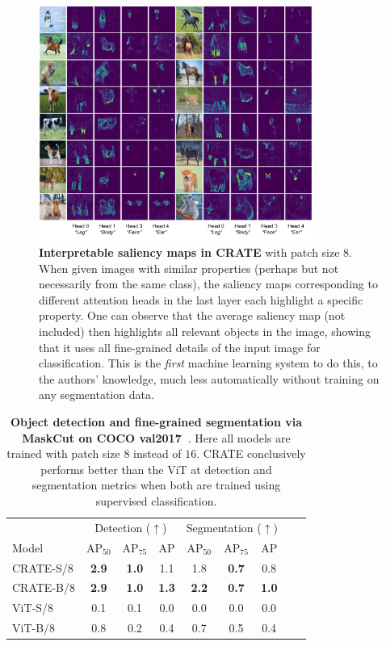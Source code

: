 \documentclass[../../book-main.tex]{subfiles}
\begin{document}
\begin{figure}
    \centering
    \includegraphics[width=0.8\textwidth]{chapters/chapter7/figs/crate_semantic_heads.pdf}
    \caption{\small\textbf{Interpretable saliency maps in CRATE} with patch size \(8\). When given images with similar properties (perhaps but not necessarily from the same class), the saliency maps corresponding to different attention heads in the last layer each highlight a specific property. One can observe that the average saliency map (not included) then highlights all relevant objects in the image, showing that it uses all fine-grained details of the input image for classification. This is the \textit{first} machine learning system to do this, to the authors' knowledge, much less automatically without training on any segmentation data.}
    \label{fig:crate_semantic_heads}
\end{figure}

\begin{table}
    \centering
    \begin{tabular}{@{}lcccccccc@{}}
    \toprule
     &  \multicolumn{3}{c}{Detection (\(\uparrow\))} &  \multicolumn{3}{c}{Segmentation (\(\uparrow\))} \\ 
    Model & AP$_{50}$ & AP$_{75}$ & AP & AP$_{50}$ & AP$_{75}$ & AP  \\ 
    \midrule
    CRATE-S/8 & \textbf{2.9} & \textbf{1.0} & 1.1 & 1.8 & \textbf{0.7} & 0.8 \\
    CRATE-B/8 & \textbf{2.9} & \textbf{1.0} & \textbf{1.3} & \textbf{2.2} & \textbf{0.7} & \textbf{1.0} \\
    ViT-S/8 & 0.1& 0.1 & 0.0 & 0.0 & 0.0 & 0.0 \\
    ViT-B/8 & 0.8 & 0.2 & 0.4 & 0.7 & 0.5 & 0.4 \\
    \bottomrule
    \end{tabular}
    \caption{\small \textbf{Object detection and fine-grained segmentation via MaskCut on COCO {val2017}~\citep{lin2014microsoft}}. Here all models are trained with patch size \(8\) instead of \(16\). CRATE conclusively performs better than the ViT at detection and segmentation metrics when both are trained using supervised classification.}
    \label{tab:crate_detection_segmentation}
\end{table}
\end{document}
